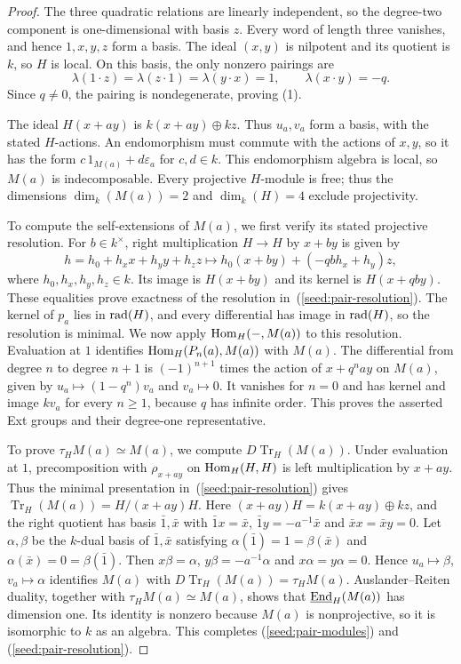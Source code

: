 \documentclass[11pt]{article}
\begin{document}
\begin{proof}
The three quadratic relations are linearly independent, so the
degree-two component is one-dimensional with basis $z$.
Every word of length three vanishes, and hence $1,x,y,z$ form a basis.
The ideal $(x,y)$ is nilpotent and its quotient is $k$, so $H$ is
local. On this basis, the only nonzero pairings are
\[
 \lambda(1\cdot z)=\lambda(z\cdot1)=\lambda(y\cdot x)=1,
 \qquad \lambda(x\cdot y)=-q.
\]
Since $q\ne0$, the pairing is nondegenerate, proving (1).

The ideal $H(x+ay)$ is $k(x+ay)\oplus kz$. Thus $u_a,v_a$ form a
basis, with the stated $H$-actions. An endomorphism must commute with the actions of $x,y$, so it has the
form $c\,1_{M(a)}+d\varepsilon_a$ for $c, d\in k$. This endomorphism algebra is local,
so $M(a)$ is indecomposable.  Every projective $H$-module is free;
thus the dimensions $\dim_k(M(a))=2$ and $\dim_k(H)=4$ exclude
projectivity.

To compute the self-extensions of $M(a)$, we first verify its stated
projective resolution. For $b\in k^\times$, right multiplication $H\to H$ by
$x+by$ is given by
$$h=h_0+h_xx+h_yy+h_zz\mapsto h_0(x+by)+(-qb h_x+h_y)z,$$
where $h_0, h_x, h_y, h_z\in k$. Its image is $H(x+by)$ and its kernel is $H(x+qby)$.
These equalities prove exactness of the resolution
in~\textup{(\ref{seed:pair-resolution})}.
The kernel of $p_a$ lies in ${\rm rad}(H)$, and every differential has
image in ${\rm rad}(H)$, so the resolution is minimal.
We now apply ${\rm Hom}_H(-,M(a))$ to this resolution.
Evaluation at $1$ identifies ${\rm Hom}_H(P_n(a),M(a))$ with $M(a)$.
The differential from degree $n$ to degree $n+1$ is
$(-1)^{n+1}$ times the action of $x+q^n a y$ on $M(a)$, given by
$u_a\mapsto(1-q^n)v_a$ and $v_a\mapsto 0$.
It vanishes for $n=0$ and has kernel and image $kv_a$ for every
$n\ge1$, because $q$ has infinite order.  This proves the asserted
Ext groups and their degree-one representative.

To prove $\tau_HM(a)\simeq M(a)$, we compute $D\operatorname{Tr}_H(M(a))$.
Under evaluation at $1$, precomposition with $\rho_{x+ay}$ on
${\rm Hom}_H(H,H)$ is left multiplication by $x+ay$.
Thus the minimal presentation in~\textup{(\ref{seed:pair-resolution})} gives
$\operatorname{Tr}_H(M(a))=H/(x+ay)H$.
Here $(x+ay)H=k(x+ay)\oplus kz$, and the right quotient has basis
$\bar1,\bar x$ with $\bar1x=\bar x$,
$\bar1y=-a^{-1}\bar x$ and $\bar x x=\bar x y=0$.
Let $\alpha,\beta$ be the $k$-dual basis of $\bar1,\bar x$ satisfying $\alpha(\bar1)=1=
\beta(\bar x)$ and $\alpha(\bar x)=0=\beta(\bar 1)$.
Then $x\beta=\alpha$, $y\beta=-a^{-1}\alpha$ and $x\alpha=y\alpha=0$.
Hence $u_a\mapsto\beta$, $v_a\mapsto\alpha$ identifies $M(a)$ with
$D\operatorname{Tr}_H(M(a))=\tau_HM(a)$.
Auslander--Reiten duality, together with $\tau_HM(a)\simeq M(a)$,
shows that $\underline{{\rm End}}_H(M(a))$ has dimension one.  Its identity is
nonzero because $M(a)$ is nonprojective, so it is isomorphic to $k$
as an algebra.  This completes \textup{(\ref{seed:pair-modules})} and \textup{(\ref{seed:pair-resolution})}.
\end{proof}
\end{document}
